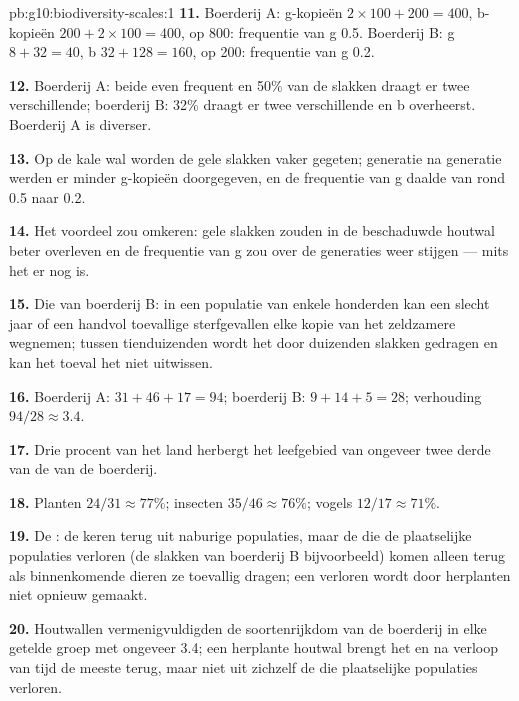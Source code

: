 \begin{solution}{pb:g10:biodiversity-scales:1}
\textbf{11.} Boerderij A: g-kopieën $2 \times 100 + 200 = 400$, b-kopieën
$200 + 2 \times 100 = 400$, op 800: frequentie van g 0.5. Boerderij B: g
$8 + 32 = 40$, b $32 + 128 = 160$, op 200: frequentie van g 0.2.

\textbf{12.} Boerderij A: beide  even frequent en 50\% van de
slakken draagt er twee verschillende; boerderij B: 32\% draagt er twee
verschillende en b overheerst. Boerderij A is diverser.

\textbf{13.} Op de kale wal worden de gele slakken vaker gegeten;
generatie na generatie werden er minder g-kopieën doorgegeven, en de
frequentie van g daalde van rond 0.5 naar 0.2.

\textbf{14.} Het voordeel zou omkeren: gele slakken zouden in de
beschaduwde houtwal beter overleven en de frequentie van g zou over de
generaties weer stijgen --- mits het  er nog is.

\textbf{15.} Die van boerderij B: in een populatie van enkele honderden
kan een slecht jaar of een handvol toevallige sterfgevallen elke kopie
van het zeldzamere  wegnemen; tussen tienduizenden wordt het 
door duizenden slakken gedragen en kan het toeval het niet uitwissen.

\textbf{16.} Boerderij A: $31 + 46 + 17 = 94$; boerderij B: $9 + 14 + 5 = 28$;
verhouding $94/28 \approx 3.4$.

\textbf{17.} Drie procent van het land herbergt het leefgebied van
ongeveer twee derde van de  van de boerderij.

\textbf{18.} Planten $24/31 \approx 77\%$; insecten $35/46 \approx 76\%$;
vogels $12/17 \approx 71\%$.

\textbf{19.} De : de  keren terug uit
naburige populaties, maar de  die de plaatselijke populaties
verloren (de slakken van boerderij B bijvoorbeeld) komen alleen terug als
binnenkomende dieren ze toevallig dragen; een verloren  wordt door
herplanten niet opnieuw gemaakt.

\textbf{20.} Houtwallen vermenigvuldigden de soortenrijkdom van de
boerderij in elke getelde groep met ongeveer 3.4; een herplante houtwal
brengt het  en na verloop van tijd de meeste  terug,
maar niet uit zichzelf de  die plaatselijke populaties verloren.
\end{solution}
